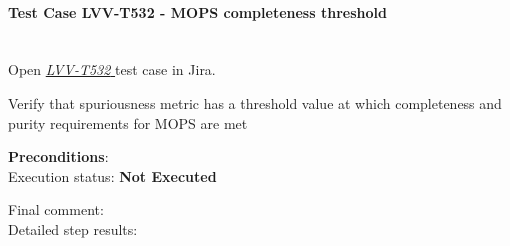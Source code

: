 \documentclass[DM,lsstdraft,STR,toc]{lsstdoc}
\begin{document}
    \paragraph{Test Case LVV-T532 - MOPS completeness threshold
 }\mbox{}\\

Open  \href{https://jira.lsstcorp.org/secure/Tests.jspa#/testCase/LVV-T532}{\textit{ LVV-T532 } }
test case in Jira.

    Verify that spuriousness metric has a threshold value at which
completeness and purity requirements for MOPS are met


    \textbf{ Preconditions}:\\
    

    Execution status: {\bf Not Executed }

    Final comment:\\


    Detailed step results:
\end{document}

